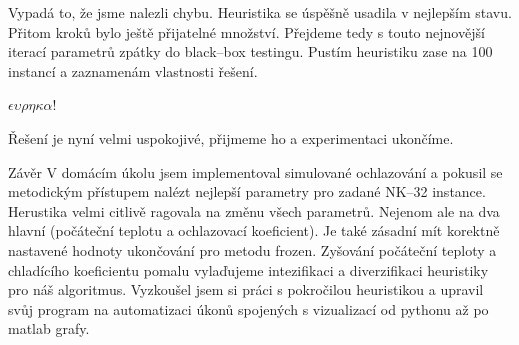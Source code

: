 
Vypadá to, že jsme nalezli chybu. Heuristika se úspěšně usadila v nejlepším stavu. Přitom kroků bylo ještě přijatelné množství. Přejdeme tedy s touto nejnovější iterací parametrů zpátky do black--box testingu. Pustím heuristiku zase na 100 instancí a zaznamenám vlastnosti řešení.

\bigskip
\centerline{}\bigskip

\hfill $\epsilon\upsilon\rho\eta\kappa\alpha$!

Řešení je nyní velmi uspokojivé, přijmeme ho a experimentaci ukončíme.









\sec Závěr
V domácím úkolu jsem implementoval simulované ochlazování a pokusil se metodickým přístupem nalézt nejlepší parametry pro zadané NK--32 instance. Herustika velmi citlivě ragovala na změnu všech parametrů. Nejenom ale na dva hlavní (počáteční teplotu a ochlazovací koeficient). Je také zásadní mít korektně nastavené hodnoty ukončování pro metodu frozen. Zyšování počáteční teploty a chladícího koeficientu pomalu vylaďujeme intezifikaci a diverzifikaci heuristiky pro náš algoritmus. Vyzkoušel jsem si práci s pokročilou heuristikou a upravil svůj program na automatizaci úkonů spojených s vizualizací od pythonu až po matlab grafy. 




\bye
